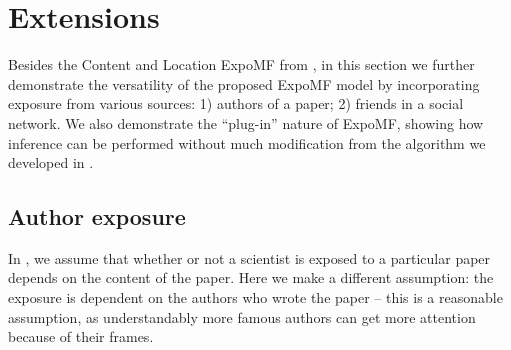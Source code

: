 \section{Extensions}

Besides the Content and Location ExpoMF from , in this section we further demonstrate the versatility of the proposed ExpoMF model by incorporating exposure from various sources: 1) authors of a paper; 2) friends in a social network. We also demonstrate the ``plug-in'' nature of ExpoMF, showing how inference can be performed without much modification from the algorithm we developed in .

\subsection{Author exposure}

In , we assume that whether or not a scientist is exposed to a particular paper depends on the content of the paper. Here we make a different assumption: the exposure is dependent on the authors who wrote the paper -- this is a reasonable assumption, as understandably more famous authors can get more attention because of their frames. 



% 

